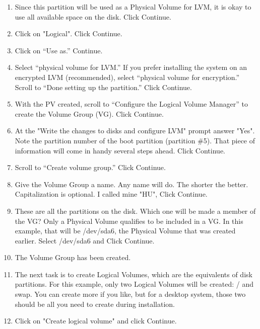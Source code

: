 \documentclass[12pt,notitlepage,onecolumn,oneside,openany,draft]{memoir}
\begin{document}
\begin{enumerate}
\item \textsf{Since this partition will be used as a Physical Volume for LVM, it is okay to use all available space on the disk. Click Continue.}
 
\item \textsf{Click on "Logical". Click Continue.}
 
\item \textsf{Click on “Use as.” Continue.} 

\item \textsf{Select “physical volume for LVM.” If you prefer installing the system on an encrypted LVM (recommended), select “physical volume for encryption.” Scroll to “Done setting up the partition.” Click Continue.} 

\item \textsf{With the PV created, scroll to “Configure the Logical Volume Manager” to create the Volume Group (VG). Click Continue.}
 
\item \textsf{At the "Write the changes to disks and configure LVM" prompt answer "Yes". Note the partition number of the boot partition (partition \#5). That piece of information will come in handy several steps ahead. Click Continue.} 

\item \textsf{Scroll to “Create volume group.” Click Continue.} 

\item \textsf{Give the Volume Group a name. Any name will do. The shorter the better. Capitalization is optional.  I called mine "HU", Click Continue.}
 
\item \textsf{These are all the partitions on the disk. Which one will be made a member of the VG? Only a Physical Volume qualifies to be included in a VG. In this example, that will be /dev/sda6, the Physical Volume that was created earlier. Select /dev/sda6 and Click Continue.}
 
\item \textsf{The Volume Group has been created.} 

\item \textsf{The next task is to create Logical Volumes, which are the equivalents of disk partitions. For this example, only two Logical Volumes will be created: / and swap. You can create more if you like, but for a desktop system, those two should be all you need to create during installation.} 

\item \textsf{Click on "Create logical volume" and click Continue.}
 

\end{enumerate}
\end{document}

